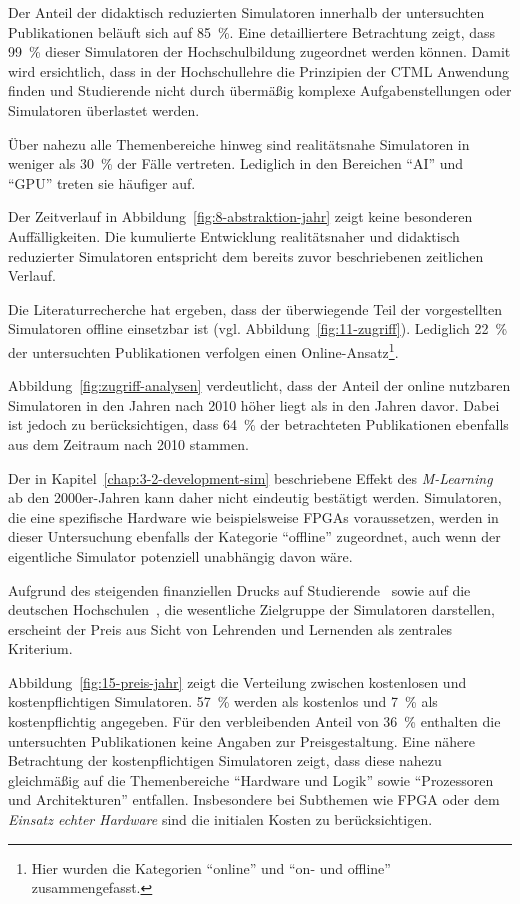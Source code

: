 Der Anteil der didaktisch reduzierten Simulatoren innerhalb der untersuchten Publikationen beläuft sich auf 85~\%. Eine detailliertere Betrachtung zeigt, dass 99~\% dieser Simulatoren der Hochschulbildung zugeordnet werden können. Damit wird ersichtlich, dass in der Hochschullehre die Prinzipien der \ac{CTML} Anwendung finden und Studierende nicht durch übermäßig komplexe Aufgabenstellungen oder Simulatoren überlastet werden.

Über nahezu alle Themenbereiche hinweg sind realitätsnahe Simulatoren in weniger als 30~\% der Fälle vertreten. Lediglich in den Bereichen \enquote{AI} und \enquote{GPU} treten sie häufiger auf.

Der Zeitverlauf in Abbildung~\ref{fig:8-abstraktion-jahr} zeigt keine besonderen Auffälligkeiten. Die kumulierte Entwicklung realitätsnaher und didaktisch reduzierter Simulatoren entspricht dem bereits zuvor beschriebenen zeitlichen Verlauf.

Die Literaturrecherche hat ergeben, dass der überwiegende Teil der vorgestellten Simulatoren offline einsetzbar ist (vgl. Abbildung~\ref{fig:11-zugriff}). Lediglich 22~\% der untersuchten Publikationen verfolgen einen Online-Ansatz\footnote{Hier wurden die Kategorien \enquote{online} und \enquote{on- und offline} zusammengefasst.}.

Abbildung~\ref{fig:zugriff-analysen} verdeutlicht, dass der Anteil der online nutzbaren Simulatoren in den Jahren nach 2010 höher liegt als in den Jahren davor. Dabei ist jedoch zu berücksichtigen, dass 64~\% der betrachteten Publikationen ebenfalls aus dem Zeitraum nach 2010 stammen.

Der in Kapitel~\ref{chap:3-2-development-sim} beschriebene Effekt des \textit{M-Learning} ab den 2000er-Jahren kann daher nicht eindeutig bestätigt werden. Simulatoren, die eine spezifische Hardware wie beispielsweise \ac{FPGA}s voraussetzen, werden in dieser Untersuchung ebenfalls der Kategorie \enquote{offline} zugeordnet, auch wenn der eigentliche Simulator potenziell unabhängig davon wäre.

Aufgrund des steigenden finanziellen Drucks auf Studierende~\parencite[S.~1]{meier_bedeutung_2023} sowie auf die deutschen Hochschulen~\cite{von_stuckrad_hochschulfinanzierung_nodate}, die wesentliche Zielgruppe der Simulatoren darstellen, erscheint der Preis aus Sicht von Lehrenden und Lernenden als zentrales Kriterium.

Abbildung~\ref{fig:15-preis-jahr} zeigt die Verteilung zwischen kostenlosen und kostenpflichtigen Simulatoren. 57~\% werden als kostenlos und 7~\% als kostenpflichtig angegeben. Für den verbleibenden Anteil von 36~\% enthalten die untersuchten Publikationen keine Angaben zur Preisgestaltung. Eine nähere Betrachtung der kostenpflichtigen Simulatoren zeigt, dass diese nahezu gleichmäßig auf die Themenbereiche \enquote{Hardware und Logik} sowie \enquote{Prozessoren und Architekturen} entfallen. Insbesondere bei Subthemen wie \ac{FPGA} oder dem \textit{Einsatz echter Hardware} sind die initialen Kosten zu berücksichtigen.

